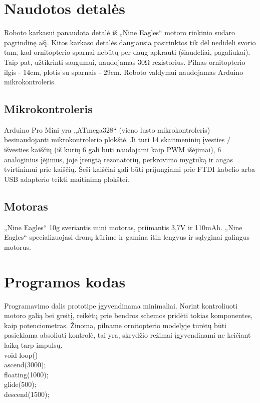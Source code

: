 \documentclass{VUMIFPSkursinis}
\begin{document}
\section{Naudotos detalės}
Roboto karkasui panaudota detalė iš  „Nine Eagles“ motoro rinkinio sudaro pagrindinę ašį. Kitos karkaso detalės daugiausia pasirinktos tik dėl nedideli svorio tam, kad ornitopterio sparnai nebūtų per daug apkrauti (šiaudeliai, pagaliukai). Taip pat, užtikrinti saugumui, naudojamas 30Ω rezistorius. Pilnas ornitopterio ilgis - 14cm, plotis su sparnais - 29cm. 
Roboto valdymui naudojamas Arduino mikrokontroleris.

\subsection{Mikrokontroleris}
Arduino Pro Mini yra „ATmega328“ (vieno lusto mikrokontroleris) besinaudojanti mikrokontrolerio plokštė. Ji turi 14 skaitmeninių įvesties / išvesties kaiščių (iš kurių 6 gali būti naudojami kaip PWM išėjimai), 6 analoginius įėjimus, joje įrengtą rezonatorių, perkrovimo mygtuką ir angas tvirtinimui prie kaiščių. Šeši kaiščiai gali būti prijungiami prie FTDI kabelio arba USB adapterio teikti maitinimą plokštei.\cite{ArduinoDok}

\subsection{Motoras}
„Nine Eagles“ 10g sveriantis mini motoras, priimantis 3,7V ir 110mAh. „Nine Eagles“ specializuojasi dronų kūrime ir gamina itin lengvus ir sąlyginai galingus motorus.

\section{Programos kodas}

Programavimo dalis prototipe įgyvendinama minimaliai. Norint kontroliuoti motoro galią bei greitį, reikėtų prie bendros schemos pridėti tokias komponentes, kaip potenciometras. Žinoma, pilname ornitopterio modelyje turėtų būti pasiekiama absoliuti kontrolė, tai yra, skrydžio režimai įgyvendinami ne keičiant laiką tarp impulsų.\\

void loop() {\\
	
	ascend(3000);\\
	floating(1000);\\
	glide(500);\\
	descend(1500);\\
}\\
\end{document}
